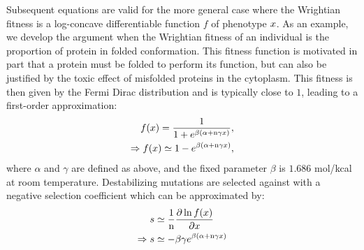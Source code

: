 \documentclass{article}
\begin{document}
Subsequent equations are valid for the more general case where the Wrightian fitness is a log-concave differentiable function $f$ of phenotype $x$.
As an example, we develop the argument when the Wrightian fitness of an individual is the proportion of protein in folded conformation.
This fitness function is motivated in part that a protein must be folded to perform its function, but can also be justified by the toxic effect of misfolded proteins in the cytoplasm. 
This fitness is then given by the Fermi Dirac distribution and is typically close to $1$, leading to a first-order approximation\cite{Goldstein2011}: 
\begin{align}
f(x) = \dfrac{1}{1 + e^{\beta (\alpha + \text{n} \gamma x)}},\\
\Rightarrow f(x) \simeq 1 - e^{\beta (\alpha + \text{n} \gamma x)}, 
\end{align}
where $\alpha$ and $\gamma$ are defined as above, and the fixed parameter $\beta$ is $1.686$ mol/kcal at room temperature.
Destabilizing mutations are selected against with a negative selection coefficient which can be approximated by:
\begin{align}
s & \simeq \frac{1}{\text{n}}\frac{ \partial \ln f(x) }{\partial x} \label{eq:s} \\
\Rightarrow s & \simeq - \beta \gamma e^{\beta (\alpha + \text{n} \gamma x)} \label{eq:s-unfolded}
\end{align}
\end{document}
